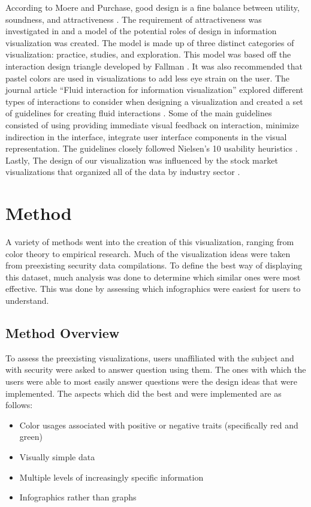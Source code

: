 \documentclass[journal]{vgtc}                %
\begin{document}
According to Moere and Purchase, good design is a fine balance between utility, soundness, and attractiveness \cite{S7}. 
The requirement of attractiveness was investigated in and a model of the potential roles of design in information visualization was created. 
The model is made up of three distinct categories of visualization: practice, studies, and exploration. 
This model was based off the interaction design triangle developed by Fallman \cite{S6}. 
It was also recommended that pastel colors are used in visualizations to add less eye strain on the user. 
The journal article “Fluid interaction for information visualization” explored different types of interactions to consider when designing a visualization and created a set of guidelines for creating fluid interactions \cite{S8}. 
Some of the main guidelines consisted of using providing immediate visual feedback on interaction, minimize indirection in the interface, integrate user interface components in the visual representation. 
The guidelines closely followed Nielsen’s 10 usability heuristics \cite{S9}. 
Lastly, The design of our visualization was influenced by the stock market visualizations that organized all of the data by industry sector \cite{S10}. 

\section{Method}
A variety of methods went into the creation of this visualization, ranging from color theory to empirical research.
Much of the visualization ideas were taken from preexisting security data compilations.
To define the best way of displaying this dataset, much analysis was done to determine which similar ones were most effective.
This was done by assessing which infographics were easiest for users to understand. 

\subsection{Method Overview}
To assess the preexisting visualizations, users unaffiliated with the subject and with security were asked to answer question using them.
The ones with which the users were able to most easily answer questions were the design ideas that were implemented.
The aspects which did the best and were implemented are as follows:
\begin{itemize}
  \item Color usages associated with positive or negative traits (specifically red and green) 
  \item Visually simple data
  \item Multiple levels of increasingly specific information
  \item Infographics rather than graphs
\end{itemize} 
\end{document}
